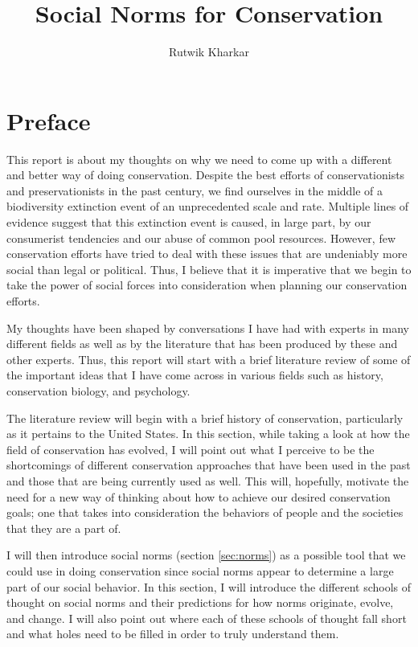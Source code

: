 \documentclass{report}
\title{Social Norms for Conservation}
\author{Rutwik Kharkar}
\begin{document}
\maketitle

\chapter*{Preface}

This report is about my thoughts on why we need to come up with a different and better way of doing conservation. Despite the best efforts of conservationists and preservationists in the past century, we find ourselves in the middle of a biodiversity extinction event of an unprecedented scale and rate. Multiple lines of evidence suggest that this extinction event is caused, in large part, by our consumerist tendencies and our abuse of common pool resources. However, few conservation efforts have tried to deal with these issues that are undeniably more social than legal or political. Thus, I believe that it is imperative that we begin to take the power of social forces into consideration when planning our conservation efforts.

My thoughts have been shaped by conversations I have had with experts in many different fields as well as by the literature that has been produced by these and other experts. Thus, this report will start with a brief literature review of some of the important ideas that I have come across in various fields such as history, conservation biology, and psychology.

The literature review will begin with a brief history of conservation, particularly as it pertains to the United States. In this section, while taking a look at how the field of conservation has evolved, I will point out what I perceive to be the shortcomings of different conservation approaches that have been used in the past and those that are being currently used as well. This will, hopefully, motivate the need for a new way of thinking about how to achieve our desired conservation goals; one that takes into consideration the behaviors of people and the societies that they are a part of.

I will then introduce social norms (section \ref{sec:norms}) as a possible tool that we could use in doing conservation since social norms appear to determine a large part of our social behavior. In this section, I will introduce the different schools of thought on social norms and their predictions for how norms originate, evolve, and change. I will also point out where each of these schools of thought fall short and what holes need to be filled in order to truly understand them.
\end{document}
